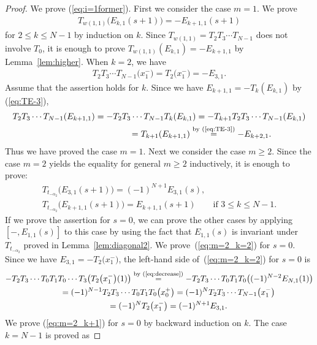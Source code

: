 \documentclass[pdftex]{sigma}
\theoremstyle{definition}
\numberwithin{equation}{section}
\begin{document}
\begin{proof}
We prove (\ref{eq:i=1former}). First we consider the case $m=1$. We prove
\begin{gather*}
T_{w(1,1)} \big(E_{k,1}(s+1)\big)=-E_{k+1,1}(s+1)
\end{gather*}
for $2 \leq k \leq N-1$ by induction on $k$. Since $T_{w(1,1)}=T_2 T_3 \cdots T_{N-1}$ does not involve $T_0$, it is enough to prove $T_{w(1,1)}(E_{k,1})=-E_{k+1,1}$ by Lemma~\ref{lem:higher}. When $k=2$, we have
\begin{gather*}
T_2 T_3 \cdots T_{N-1}\big(x_1^-\big) = T_2\big(x_1^-\big) = -E_{3,1}.
\end{gather*}
Assume that the assertion holds for $k$. Since we have $E_{k+1,1}=-T_k(E_{k,1})$ by (\ref{eq:TE-3}),
\begin{gather*}
T_2 T_3 \cdots T_{N-1}(E_{k+1,1}) = -T_2 T_3 \cdots T_{N-1} T_k(E_{k,1}) = -T_{k+1} T_2 T_3 \cdots T_{N-1} (E_{k,1})\\
\hphantom{T_2 T_3 \cdots T_{N-1}(E_{k+1,1})}{} = T_{k+1}(E_{k+1,1}) \overset{\text{by (\ref{eq:TE-3})}}{=} -E_{k+2,1}.
\end{gather*}
Thus we have proved the case $m=1$. Next we consider the case $m \geq 2$. Since the case $m=2$ yields the equality for general $m \geq 2$ inductively, it is enough to prove:
\begin{gather}
T_{t_{-\alpha_2}}\big(E_{3,1}(s+1)\big) = (-1)^{N+1}E_{3,1}(s), \label{eq:m=2_k=2}\\
T_{t_{-\alpha_2}}\big(E_{k+1,1}(s+1)\big) = E_{k+1,1}(s+1) \qquad \text{if $3 \leq k \leq N-1$}. \label{eq:m=2_k+1}
\end{gather}
If we prove the assertion for $s=0$, we can prove the other cases by applying $[-,E_{1,1}(s)]$ to this case by using the fact that $E_{1,1}(s)$ is invariant under $T_{t_{-\alpha_2}}$ proved in Lemma~\ref{lem:diagonal2}.
We prove~(\ref{eq:m=2_k=2}) for $s=0$. Since we have $E_{3,1}=-T_2\big(x_1^-\big)$, the left-hand side of~(\ref{eq:m=2_k=2}) for $s=0$ is
\begin{gather*}
-T_2 T_3 \cdots T_0 T_1 T_0 \cdots T_3 \big(T_2 \big(x_1^-\big)(1)\big) \overset{\text{by (\ref{eq:decrease})}}{=} -T_2 T_3 \cdots T_0 T_1 T_0\big( (-1)^{N-2} E_{N,1}(1) \big) \\
\qquad {} = (-1)^{N-1} T_2 T_3 \cdots T_0 T_1 T_0 \big(x_0^+\big) = (-1)^N T_2 T_3 \cdots T_{N-1} \big(x_1^-\big) \\
\qquad{} = (-1)^N T_2\big(x_1^-\big) = (-1)^{N+1} E_{3,1}.
\end{gather*}
We prove (\ref{eq:m=2_k+1}) for $s=0$ by backward induction on $k$. The case $k=N-1$ is proved as

\end{proof}
\end{document}
